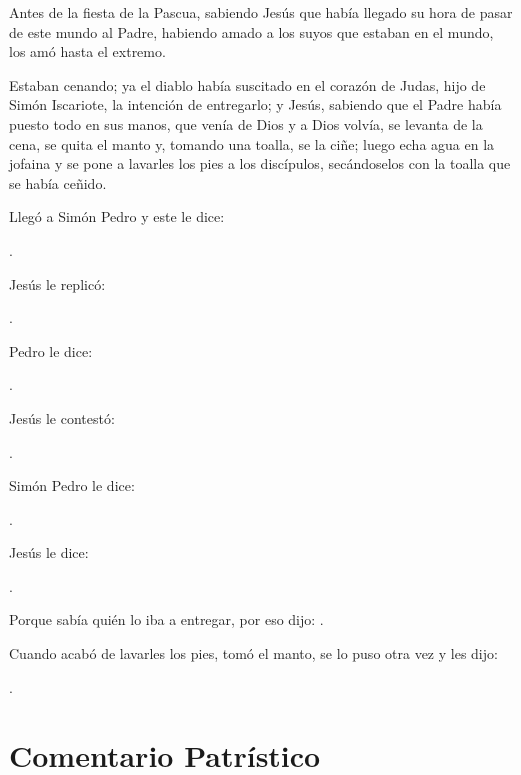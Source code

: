 \begin{scripture}
Antes de la fiesta de la Pascua, sabiendo Jesús que había llegado su hora de pasar de este mundo al Padre, habiendo amado a los suyos que estaban en el mundo, los amó hasta el extremo. 

Estaban cenando; ya el diablo había suscitado en el corazón de Judas, hijo de Simón Iscariote, la intención de entregarlo; y Jesús, sabiendo que el Padre había puesto todo en sus manos, que venía de Dios y a Dios volvía, se levanta de la cena, se quita el manto y, tomando una toalla, se la ciñe; luego echa agua en la jofaina y se pone a lavarles los pies a los discípulos, secándoselos con la toalla que se había ceñido. 

Llegó a Simón Pedro y este le dice: 

.

Jesús le replicó: 

.

Pedro le dice: 

.

Jesús le contestó: 

.

Simón Pedro le dice: 

.

Jesús le dice: 

.

Porque sabía quién lo iba a entregar, por eso dijo: . 

Cuando acabó de lavarles los pies, tomó el manto, se lo puso otra vez y les dijo: 

.
	
\end{scripture}




\newsection
\section{Comentario Patrístico}

